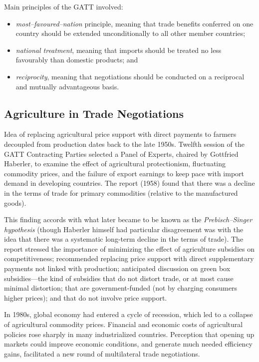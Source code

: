 \documentclass[
]{book}
\providecommand{\tightlist}{%
  \setlength{\itemsep}{0pt}\setlength{\parskip}{0pt}}
\begin{document}
Main principles of the GATT involved:

\begin{itemize}
\tightlist
\item
  \emph{most--favoured--nation} principle, meaning that trade benefits conferred on one country should be extended unconditionally to all other member countries;
\item
  \emph{national treatment}, meaning that imports should be treated no less favourably than domestic products; and
\item
  \emph{reciprocity}, meaning that negotiations should be conducted on a reciprocal and mutually advantageous basis.
\end{itemize}

\hypertarget{agriculture-in-trade-negotiations}{%
\subsection{Agriculture in Trade Negotiations}\label{agriculture-in-trade-negotiations}}

Idea of replacing agricultural price support with direct payments to farmers decoupled from production dates back to the late 1950s. Twelfth session of the GATT Contracting Parties selected a Panel of Experts, chaired by Gottfried Haberler, to examine the effect of agricultural protectionism, fluctuating commodity prices, and the failure of export earnings to keep pace with import demand in developing countries. The report (1958) found that there was a decline in the terms of trade for primary commodities (relative to the manufactured goods).

This finding accords with what later became to be known as the \emph{Prebisch--Singer hypothesis} (though Haberler himself had particular disagreement was with the idea that there was a systematic long-term decline in the terms of trade). The report stressed the importance of minimizing the effect of agriculture subsidies on competitiveness; recommended replacing price support with direct supplementary payments not linked with production; anticipated discussion on green box subsidies---the kind of subsidies that do not distort trade, or at most cause minimal distortion; that are government-funded (not by charging consumers higher prices); and that do not involve price support.

In 1980s, global economy had entered a cycle of recession, which led to a collapse of agricultural commodity prices. Financial and economic costs of agricultural policies rose sharply in many industrialized countries. Perception that opening up markets could improve economic conditions, and generate much needed efficiency gains, facilitated a new round of multilateral trade negotiations.
\end{document}
